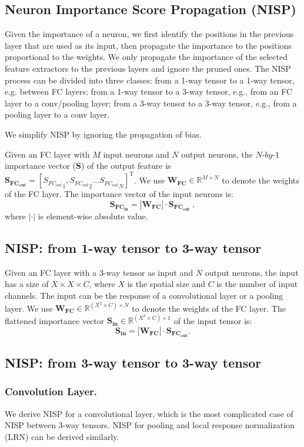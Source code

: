 \documentclass[10pt,twocolumn,letterpaper]{article}
\begin{document}
\subsection{Neuron Importance Score Propagation (NISP)}
Given the importance of a neuron, we first identify the positions in the previous layer that are used as its input, then propagate the importance to the positions proportional to the weights. 
We only propagate the importance of the selected feature extractors to the previous layers and ignore the pruned ones.
The NISP process can be divided into three classes: from a 1-way tensor to a 1-way tensor, e.g. between FC layers; from a 1-way tensor to a 3-way tensor, e.g., from an FC layer to a conv/pooling layer; from a 3-way tensor to a 3-way tensor, e.g., from a pooling layer to a conv layer.

We simplify NISP by ignoring the propagation of bias.

Given an FC layer with $M$ input neurons and $N$ output neurons, the $N
\text{-}by\text{-}1$ importance vector ($\mathbf{S}$) of the output feature is $\mathbf{S_{FC_{out}}}=\left [{S_{FC_{out}}}_1,{S_{FC_{out}}}_2 \dots {S_{FC_{out}}}_N\right ]^\text{T}$. 
We use $\mathbf{W_{FC}}\in \mathbb{R}^{M\times N}$ to denote the weights of the FC layer. The importance vector of the input neurons is:
\begin{equation}
\label{RI_FC_FC}
\mathbf{S_{FC_{in}}}=|\mathbf{W_{FC}}|  \cdot  \mathbf{S_{FC_{out}}}~,
\end{equation}
where $|\cdot|$ is element-wise absolute value.
\subsection{NISP: from 1-way tensor to 3-way tensor}
Given an FC layer with a 3-way tensor as input and $N$ output neurons, the input has a size of $X \times X \times C$, where $X$ is the spatial size and $C$ is the number of input channels. The input can be the response of a convolutional layer or a pooling layer.
We use $\mathbf{W_{FC}}\in \mathbb{R}^{(X^2 \times C)\times N}$ to denote the weights of the FC layer. The flattened importance vector $\mathbf{S_{in}} \in \mathbb{R}^ {(X^2 \times C)\times 1}$ of the input tensor is:
\begin{equation}
\label{RI_FC_conv}
\mathbf{S_{in}}=|\mathbf{W_{FC}}| \cdot \mathbf{S_{FC_{out}}}.
\end{equation}\subsection{NISP: from 3-way tensor to 3-way tensor}\subsubsection{Convolution Layer.}%
We derive NISP for a convolutional layer, which is the most complicated case of NISP between 3-way tensors.
NISP for pooling and local response normalization (LRN) can be derived similarly.
\end{document}
